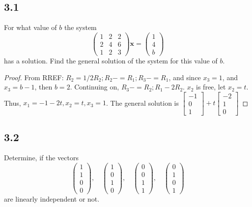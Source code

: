 \documentclass{amsart}
\begin{document}
\subsection*{3.1}
For what value of $b$ the system
\[
\begin{pmatrix}
1 & 2 & 2 \\
2 & 4 & 6 \\
1 & 2 & 3
\end{pmatrix}
\mathbf{x} =
\begin{pmatrix}
1 \\ 4 \\ b
\end{pmatrix}
\]
has a solution. Find the general solution of the system for this value of $b$.
\begin{proof}
    From RREF: $R_2 = 1/2R_2; R_2 -= R_1; R_3 -= R_1$, and since $x_3 = 1$, and $x_3 = b-1$, then $b=2$. Continuing on, $R_3 -= R_2; R_1 -2R_2$. $x_2$ is free, let $x_2 = t$. Thus, $x_1 = -1-2t, x_2 = t, x_3 = 1$. The general solution is $\begin{bmatrix}
        -1 \\ 0 \\ 1 
    \end{bmatrix} + t \begin{bmatrix}
        -2 \\ 1 \\ 0
    \end{bmatrix}$
\end{proof}
\subsection*{3.2}
Determine, if the vectors
\[
\begin{pmatrix} 1\\1\\0\\0 \end{pmatrix}, \quad
\begin{pmatrix} 1\\0\\1\\0 \end{pmatrix}, \quad
\begin{pmatrix} 0\\0\\1\\1 \end{pmatrix}, \quad
\begin{pmatrix} 0\\1\\0\\1 \end{pmatrix}
\]
are linearly independent or not.
\end{document}
